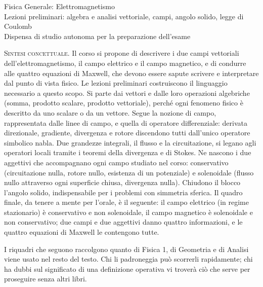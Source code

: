 \documentclass[11pt,a4paper]{article}
\newcommand{\titoletto}[1]{\par\Needspace{4\baselineskip}\medskip\noindent{\large\scshape #1}\par\nopagebreak\smallskip\noindent}
\begin{document}
\begin{center}
{\Large Fisica Generale: Elettromagnetismo}\\[6pt]
{\large Lezioni preliminari: algebra e analisi vettoriale, campi, angolo solido, legge di Coulomb}\\[6pt]
Dispensa di studio autonoma per la preparazione dell'esame
\end{center}
\vspace{1ex}

\noindent\textsc{Sintesi concettuale.} Il corso si propone di descrivere i due campi vettoriali dell'elettromagnetismo, il campo elettrico e il campo magnetico, e di condurre alle quattro equazioni di Maxwell, che devono essere sapute scrivere e interpretare dal punto di vista fisico. Le lezioni preliminari costruiscono il linguaggio necessario a questo scopo. Si parte dai vettori e dalle loro operazioni algebriche (somma, prodotto scalare, prodotto vettoriale), perché ogni fenomeno fisico è descritto da uno scalare o da un vettore. Segue la nozione di campo, rappresentata dalle linee di campo, e quella di operatore differenziale: derivata direzionale, gradiente, divergenza e rotore discendono tutti dall'unico operatore simbolico nabla. Due grandezze integrali, il flusso e la circuitazione, si legano agli operatori locali tramite i teoremi della divergenza e di Stokes. Ne nascono i due aggettivi che accompagnano ogni campo studiato nel corso: conservativo (circuitazione nulla, rotore nullo, esistenza di un potenziale) e solenoidale (flusso nullo attraverso ogni superficie chiusa, divergenza nulla). Chiudono il blocco l'angolo solido, indispensabile per i problemi con simmetria sferica. Il quadro finale, da tenere a mente per l'orale, è il seguente: il campo elettrico (in regime stazionario) è conservativo e non solenoidale, il campo magnetico è solenoidale e non conservativo; due campi e due aggettivi danno quattro informazioni, e le quattro equazioni di Maxwell le contengono tutte.

\medskip

\titoletto{Prerequisiti e strumenti di calcolo.} 
I riquadri che seguono raccolgono quanto di Fisica 1, di Geometria e di Analisi viene usato nel resto del testo. Chi li padroneggia può scorrerli rapidamente; chi ha dubbi sul significato di una definizione operativa vi troverà ciò che serve per proseguire senza altri libri.
\end{document}
